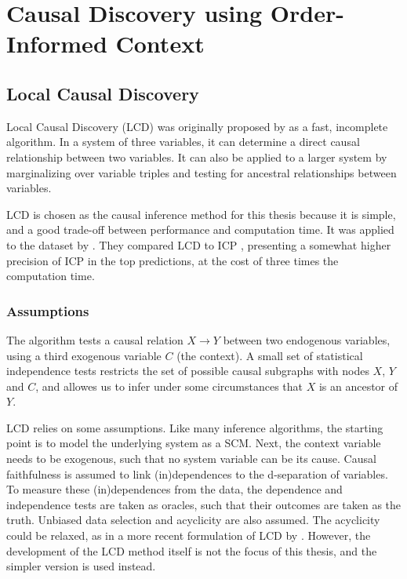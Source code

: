 \newpage
\section{Causal Discovery using Order-Informed Context}


\subsection{Local Causal Discovery}

Local Causal Discovery (LCD) was originally proposed by \citet{cooper1997simple} as a fast, incomplete algorithm. In a system of three variables, it can determine a direct causal relationship between two variables. It can also be applied to a larger system by marginalizing over variable triples and testing for ancestral relationships between variables. 

LCD is chosen as the causal inference method for this thesis because it is simple, and a good trade-off between performance and computation time. It was applied to the \citet{kemmeren2014large} dataset by \citet{versteeg2019boosting}. They compared LCD to ICP \citep{peters2016causal}, presenting a somewhat higher precision of ICP in the top predictions, at the cost of three times the computation time. 

\subsubsection{Assumptions}

The algorithm tests a causal relation $X\to Y$ between two endogenous variables, using a third exogenous variable $C$ (the context). A small set of statistical independence tests restricts the set of possible causal subgraphs with nodes $X$, $Y$ and $C$, and allowes us to infer under some circumstances that $X$ is an ancestor of $Y$.

LCD relies on some assumptions. Like many inference algorithms, the starting point is to model the underlying system as a SCM. Next, the context variable needs to be exogenous, such that no system variable can be its cause. Causal faithfulness is assumed to link (in)dependences to the d-separation of variables. To measure these (in)dependences from the data, the dependence and independence tests are taken as oracles, such that their outcomes are taken as the truth. Unbiased data selection and acyclicity are also assumed. The acyclicity could be relaxed, as in a more recent formulation of LCD by \citet{mooij2016joint}. However, the development of the LCD method itself is not the focus of this thesis, and the simpler version is used instead.

